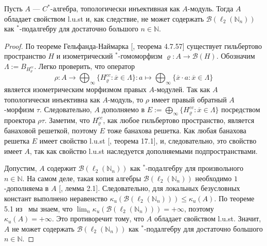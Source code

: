 \begin{proposition}\label{TopInjIdHaveLUST} Пусть $A$ --- $C^*$-алгебра,
топологически инъективная как $A$-модуль. Тогда $A$ обладает свойством l.u.st и,
как следствие, не может содержать $\mathcal{B}(\ell_2(\mathbb{N}_n))$ как
${}^*$-подалгебру для достаточно большого $n\in\mathbb{N}$.
\end{proposition}
\begin{proof} По теореме Гельфанда-Наймарка [\cite{HelBanLocConvAlg}, теорема
4.7.57] существует гильбертово пространство $H$ и изометрический
${}^*$-гомоморфизм $\varrho:A\to\mathcal{B}(H)$. Обозначим
$\Lambda:=B_{H_\varrho^{cc}}$. Легко проверить, что оператор 
$$
\rho:A\to\bigoplus\nolimits_\infty \{H_\varrho^{cc}:\overline{x}\in \Lambda \}
:a\mapsto \bigoplus\nolimits_\infty \{
    \overline{x}\cdot a:\overline{x}\in \Lambda \}
$$
является изометрическим морфизмом правых $A$-модулей. Так как $A$ топологически
инъективна как $A$-модуль, то $\rho$ имеет правый обратный $A$-морфизм $\tau$.
Следовательно, $A$ дополняемо в $E:=\bigoplus_\infty
\{H_\varrho^{cc}:\overline{x}\in \Lambda \}$ посредством проектора $\rho\tau$.
Заметим, что $H_{\varrho}^{cc}$, как любое гильбертово пространство, является
банаховой решеткой, поэтому $E$ тоже банахова решетка. Как любая банахова
решетка $E$ имеет свойство l.u.st [\cite{DiestAbsSumOps}, теорема 17.1], и,
следовательно, это свойство имеет $A$, так как свойство l.u.st наследуется
дополняемыми подпространствами.

Допустим, $A$ содержит $\mathcal{B}(\ell_2(\mathbb{N}_n))$ как ${}^*$-подалгебру
для произвольного $n\in\mathbb{N}$. На самом деле, такая копия алгебры
$\mathcal{B}(\ell_2(\mathbb{N}_n))$ необходимо $1$-дополняема в $A$
[\cite{LauLoyWillisAmnblOfBanAndCStarAlgsOfLCG}, лемма 2.1]. Следовательно, для
локальных безусловных констант выполнено неравенство
$\kappa_u(\mathcal{B}(\ell_2(\mathbb{N}_n)))\leq \kappa_u(A)$. По теореме 5.1
из~\cite{GorLewAbsSmOpAndLocUncondStrct} мы знаем, что 
$\lim_n \kappa_u(\mathcal{B}(\ell_2(\mathbb{N}_n)))=+\infty$, поэтому
$\kappa_u(A)=+\infty$. Это противоречит тому, что $A$ обладает свойством l.u.st.
Значит, $A$ не может содержать $\mathcal{B}(\ell_2(\mathbb{N}_n))$ как
${}^*$-подалгебру для достаточно большого $n\in\mathbb{N}$.
\end{proof}

